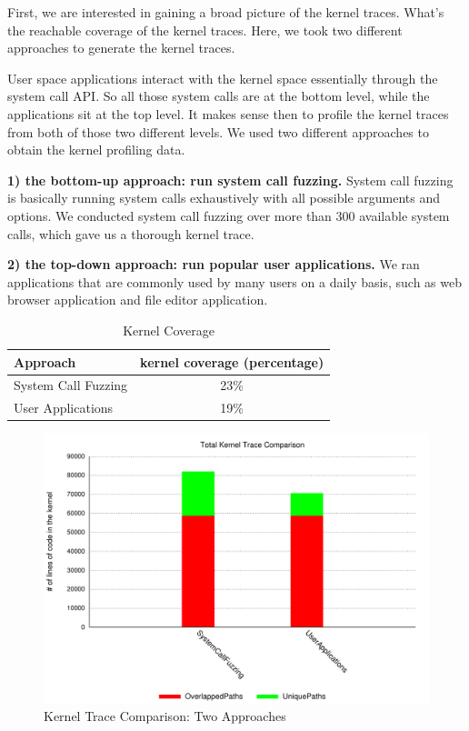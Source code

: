 First, we are interested in gaining a broad picture of the kernel traces. 
What's the reachable coverage of the kernel traces. 
Here, we took two different approaches to generate the kernel traces. 

User space applications interact with the kernel space essentially through the system call API. 
So all those system calls are at the bottom level, while the applications sit at the top level. 
It makes sense then to profile the kernel traces from both of those two different levels. 
We used two different approaches to obtain the kernel profiling data. 

\textbf{1) the bottom-up approach: run system call fuzzing.}
System call fuzzing is basically running system calls exhaustively with all possible 
arguments and options. We conducted system call fuzzing over more than 300 available system calls, 
which gave us a thorough kernel trace. 

\textbf{2) the top-down approach: run popular user applications.} 
We ran applications that are commonly used by many users on a daily basis, such as web browser application
and file editor application.  

\begin{table}[ht]
\centering
\begin{tabular}{|l|c|}
  \hline
  Approach & kernel coverage (percentage) \\
  \hline \hline
  System Call Fuzzing & 23\% \\
  \hline
  User Applications & 19\% \\
  \hline
\end{tabular}
\caption {Kernel Coverage}
\label{table:kernel_coverage}
\end{table}

\begin{figure}[h]
\centering
\includegraphics[width=1.0\columnwidth]{diagram/lind_ccs15_diagram_01.pdf}
\caption{Kernel Trace Comparison: Two Approaches}
\label{fig:two_approaches_trace}
\end{figure}

